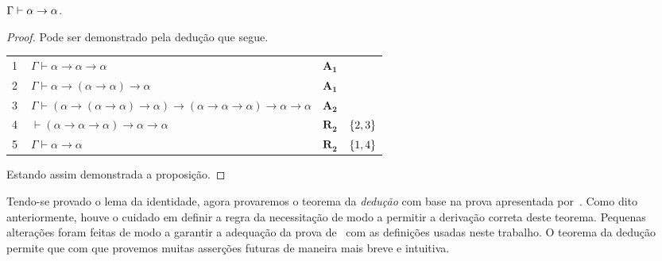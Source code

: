     \begin{tcolorbox}[enhanced jigsaw, breakable, sharp corners, colframe=black, colback=white, boxrule=0.5pt, left=1.5mm, right=1.5mm, top=1.5mm, bottom=1.5mm]
    \begin{lemma}[Identidade]\label{identity}
        $\Gamma\mathrel{\vdash}\alpha\to\alpha$.
        \begin{proof}
            Pode ser demonstrado pela dedução que segue.

            \vspace{0.5\baselineskip}
            \footnotesize
            \newlength{\rowskip}
            \setlength{\rowskip}{0.5\baselineskip}
            \begin{xltabular}{\textwidth}{r | X l l}
                \scriptsize{\phantom{0}1}\phantom{ } & $\ \Gamma\vdash\alpha\to\alpha\to\alpha$                                                              & \hyperref[modal.axiom.1]{$\mathbf{A_1}$}           & \\[\rowskip]
                \scriptsize{\phantom{0}2}\phantom{ } & $\ \Gamma\vdash\alpha\to(\alpha\to\alpha)\to\alpha$                                                   & \hyperref[modal.axiom.1]{$\mathbf{A_1}$}           & \\[\rowskip]
                \scriptsize{\phantom{0}3}\phantom{ } & $\ \Gamma\vdash(\alpha\to(\alpha\to\alpha)\to\alpha)\to(\alpha\to\alpha\to\alpha)\to\alpha\to\alpha$  & \hyperref[modal.axiom.1]{$\mathbf{A_2}$}           & \\[\rowskip]
                \scriptsize{\phantom{0}4}\phantom{ } & $\ \vdash(\alpha\to\alpha\to\alpha)\to\alpha\to\alpha$                                                & $\hyperref[modal.rule.2]{\mathbf{R_2}}$            & $\left\{2,3\right\}$\\[\rowskip]
                \scriptsize{\phantom{0}5}\phantom{ } & $\ \Gamma\vdash\alpha\to\alpha$                                                                       & $\hyperref[modal.rule.2]{\mathbf{R_2}}$\phantom{1} & $\left\{1,4\right\}$
            \end{xltabular}
            \normalsize

            \vspace{.5\baselineskip}
            Estando assim demonstrada a proposição.
        \end{proof}
    \end{lemma}
    \end{tcolorbox}

    \vspace{.5\baselineskip}
    Tendo-se provado o lema da identidade, agora provaremos o teorema da \emph{dedução} com base na prova apresentada por~\cite{Hakli}.
    Como dito anteriormente, houve o cuidado em definir a regra da necessitação de modo a permitir a derivação correta deste teorema.
    Pequenas alterações foram feitas de modo a garantir a adequação da prova de~\cite{Hakli} com as definições usadas neste trabalho.
    O teorema da dedução permite que com que provemos muitas asserções futuras de maneira mais breve e intuitiva.

